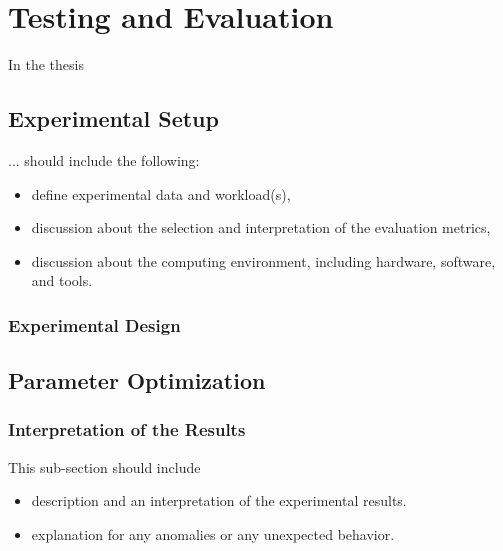 \chapter{Testing and Evaluation\label{cha:chapter5}}
In the thesis 

\section{Experimental Setup\label{sec:exp}}
... should include the following:
\begin{itemize}

\item define experimental data and workload(s),
\item discussion about the selection and interpretation of the evaluation metrics,
\item discussion about the computing environment, including hardware, software, and tools.
\end{itemize}

\subsection{Experimental Design}


\section{Parameter Optimization\label{sec:parameterOptimization}}


\subsection{Interpretation of the Results}
This sub-section should include
\begin{itemize}
\item description and an interpretation of the experimental results.
\item explanation for any anomalies or any unexpected behavior.
\end{itemize}

